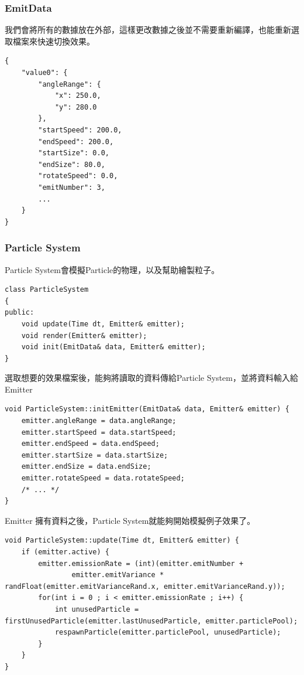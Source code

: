 \subsubsection{EmitData}
我們會將所有的數據放在外部，這樣更改數據之後並不需要重新編譯，也能重新選取檔案來快速切換效果。
\begin{lstlisting}
{
    "value0": {
        "angleRange": {
            "x": 250.0,
            "y": 280.0
        },
        "startSpeed": 200.0,
        "endSpeed": 200.0,
        "startSize": 0.0,
        "endSize": 80.0,
        "rotateSpeed": 0.0,
        "emitNumber": 3,
        ...
    }
}
\end{lstlisting}

\subsubsection{Particle System}

Particle System會模擬Particle的物理，以及幫助繪製粒子。
\begin{lstlisting}
class ParticleSystem
{
public:
    void update(Time dt, Emitter& emitter);
    void render(Emitter& emitter);
    void init(EmitData& data, Emitter& emitter);
}
\end{lstlisting}

選取想要的效果檔案後，能夠將讀取的資料傳給Particle System，並將資料輸入給Emitter

\begin{lstlisting}
void ParticleSystem::initEmitter(EmitData& data, Emitter& emitter) {
    emitter.angleRange = data.angleRange;
    emitter.startSpeed = data.startSpeed;
    emitter.endSpeed = data.endSpeed;
    emitter.startSize = data.startSize;
    emitter.endSize = data.endSize;
    emitter.rotateSpeed = data.rotateSpeed;
    /* ... */
}
\end{lstlisting}

Emitter 擁有資料之後，Particle System就能夠開始模擬例子效果了。

\begin{lstlisting}
void ParticleSystem::update(Time dt, Emitter& emitter) {
    if (emitter.active) {
        emitter.emissionRate = (int)(emitter.emitNumber + 
                emitter.emitVariance * randFloat(emitter.emitVarianceRand.x, emitter.emitVarianceRand.y));
        for(int i = 0 ; i < emitter.emissionRate ; i++) {
            int unusedParticle = firstUnusedParticle(emitter.lastUnusedParticle, emitter.particlePool);
            respawnParticle(emitter.particlePool, unusedParticle);
        }
    }
}
\end{lstlisting}

